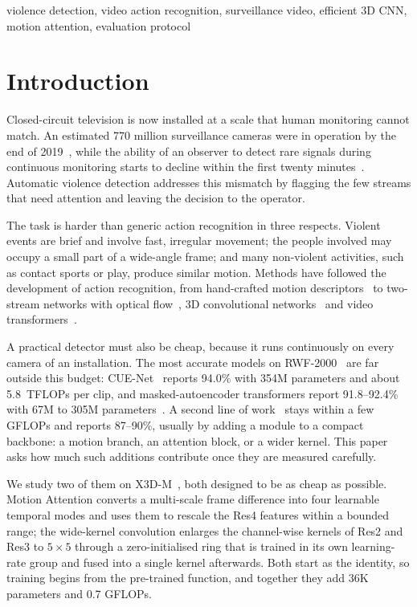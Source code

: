 \documentclass[conference]{IEEEtran}
\begin{document}
\begin{IEEEkeywords}
violence detection, video action recognition, surveillance video,
efficient 3D CNN, motion attention, evaluation protocol
\end{IEEEkeywords}

\section{Introduction}
\label{sec:intro}

Closed-circuit television is now installed at a scale that human
monitoring cannot match. An estimated 770 million surveillance cameras
were in operation by the end of 2019~\cite{cnbc2019}, while the ability of
an observer to detect rare signals during continuous monitoring starts to
decline within the first twenty minutes~\cite{mackworth1948}. Automatic
violence detection addresses this mismatch by flagging the few streams
that need attention and leaving the decision to the operator.

The task is harder than generic action recognition in three respects.
Violent events are brief and involve fast, irregular movement; the people
involved may occupy a small part of a wide-angle frame; and many
non-violent activities, such as contact sports or play, produce similar
motion. Methods have followed the development of action recognition, from
hand-crafted motion descriptors~\cite{idt,vif,hockey} to two-stream
networks with optical flow~\cite{twostream}, 3D convolutional
networks~\cite{c3d,i3d,slowfast,x3d} and video
transformers~\cite{timesformer,videoswin}.

A practical detector must also be cheap, because it runs continuously on
every camera of an installation. The most accurate models on
RWF-2000~\cite{rwf2000} are far outside this budget: CUE-Net~\cite{cuenet}
reports 94.0\% with 354M parameters and about 5.8~TFLOPs per clip, and
masked-autoencoder transformers report 91.8--92.4\% with 67M to 305M
parameters~\cite{videomae,mixvit}. A second line of
work~\cite{rwf2000,sepconvlstm,mdcn,biltma} stays within a few GFLOPs and
reports 87--90\%, usually by adding a module to a compact backbone: a
motion branch, an attention block, or a wider kernel. This paper asks how
much such additions contribute once they are measured carefully.

We study two of them on X3D-M~\cite{x3d}, both designed to be as cheap as
possible. Motion Attention converts a multi-scale frame difference into
four learnable temporal modes and uses them to rescale the Res4 features
within a bounded range; the wide-kernel convolution enlarges the
channel-wise kernels of Res2 and Res3 to $5\times5$ through a
zero-initialised ring that is trained in its own learning-rate group and
fused into a single kernel afterwards. Both start as the identity, so
training begins from the pre-trained function, and together they add 36K
parameters and 0.7 GFLOPs.
\end{document}
